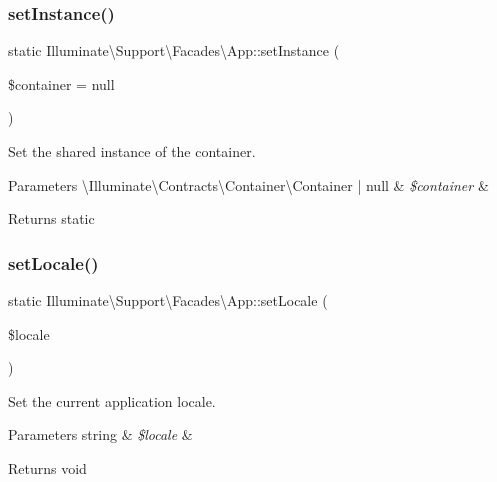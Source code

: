 \subsubsection{\texorpdfstring{set\+Instance()}{setInstance()}}
{\footnotesize\ttfamily static Illuminate\textbackslash{}\+Support\textbackslash{}\+Facades\textbackslash{}\+App\+::set\+Instance (\begin{DoxyParamCaption}\item[{}]{\$container = {\ttfamily null} }\end{DoxyParamCaption})\hspace{0.3cm}{\ttfamily [static]}}

Set the shared instance of the container.


\begin{DoxyParams}[1]{Parameters}
\textbackslash{}\+Illuminate\textbackslash{}\+Contracts\textbackslash{}\+Container\textbackslash{}\+Container | null & {\em \$container} & \\
\hline
\end{DoxyParams}
\begin{DoxyReturn}{Returns}
static 
\end{DoxyReturn}
\mbox{\label{class_illuminate_1_1_support_1_1_facades_1_1_app_a8086d8d1be8bc33af2730f4a23f8dd7d}} 
\subsubsection{\texorpdfstring{set\+Locale()}{setLocale()}}
{\footnotesize\ttfamily static Illuminate\textbackslash{}\+Support\textbackslash{}\+Facades\textbackslash{}\+App\+::set\+Locale (\begin{DoxyParamCaption}\item[{}]{\$locale }\end{DoxyParamCaption})\hspace{0.3cm}{\ttfamily [static]}}

Set the current application locale.


\begin{DoxyParams}[1]{Parameters}
string & {\em \$locale} & \\
\hline
\end{DoxyParams}
\begin{DoxyReturn}{Returns}
void 
\end{DoxyReturn}
\mbox{\label{class_illuminate_1_1_support_1_1_facades_1_1_app_a10f125eb3c7536818ed2cfe0458e179b}} 
